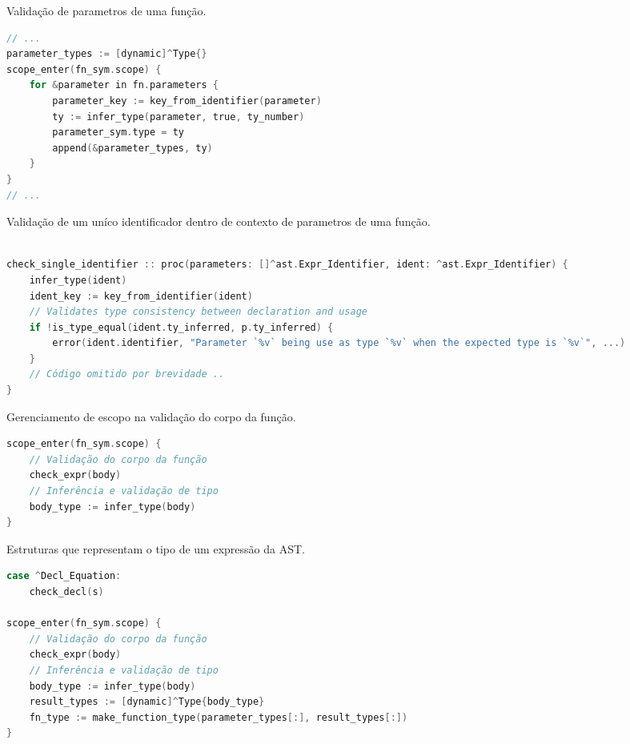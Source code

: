 \begin{codigo}[htb]
    \caption{\small Validação de parametros de uma função. }
    \label{cod-parametros-validation}
\begin{lstlisting}[language=C, numbers=none, frame=none, inputencoding=latin1]
// ...
parameter_types := [dynamic]^Type{}
scope_enter(fn_sym.scope) {
    for &parameter in fn.parameters {
        parameter_key := key_from_identifier(parameter)
        ty := infer_type(parameter, true, ty_number)
        parameter_sym.type = ty
        append(&parameter_types, ty)
    }
}
// ...
\end{lstlisting}
\end{codigo}


\begin{codigo}[htb]
    \caption{\small Validação de um uníco identificador dentro de contexto de parametros de uma função. }
    \label{cod-check-single-ident}
\begin{lstlisting}[language=C, numbers=none, frame=none, inputencoding=latin1]

check_single_identifier :: proc(parameters: []^ast.Expr_Identifier, ident: ^ast.Expr_Identifier) {
    infer_type(ident)
    ident_key := key_from_identifier(ident)
    // Validates type consistency between declaration and usage
    if !is_type_equal(ident.ty_inferred, p.ty_inferred) {
        error(ident.identifier, "Parameter `%v` being use as type `%v` when the expected type is `%v`", ...)
    }
    // Código omitido por brevidade ..
}
\end{lstlisting}
\end{codigo}


\begin{codigo}[htb]
    \caption{\small Gerenciamento de escopo na validação do corpo da função.}
    \label{cod-scope-management}
\begin{lstlisting}[language=C, numbers=none, frame=none, inputencoding=latin1]
scope_enter(fn_sym.scope) {
    // Validação do corpo da função
    check_expr(body)
    // Inferência e validação de tipo
    body_type := infer_type(body)
}
\end{lstlisting}
\end{codigo}


\begin{codigo}[htb]
    \caption{\small Estruturas que representam o tipo de um expressão da AST.}
    \label{cod-types-structs}
\begin{lstlisting}[language=C, numbers=none, frame=none, inputencoding=utf8]
case ^Decl_Equation:
    check_decl(s)

scope_enter(fn_sym.scope) {
    // Validação do corpo da função
    check_expr(body)
    // Inferência e validação de tipo
    body_type := infer_type(body)
    result_types := [dynamic]^Type{body_type}
    fn_type := make_function_type(parameter_types[:], result_types[:])
}
\end{lstlisting}
\end{codigo}

